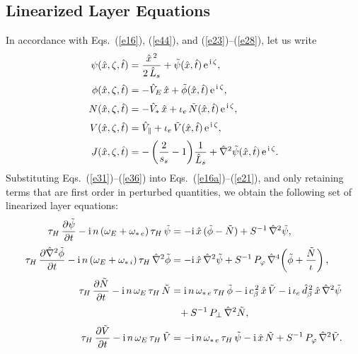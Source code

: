 \documentclass[12pt,prb,aps]{revtex4-1}
\begin{document}
\subsection{Linearized Layer Equations}
In accordance with Eqs.~(\ref{e16}), (\ref{e44}), and (\ref{e23})--(\ref{e28}), let us write
\begin{align}\label{e31}
\psi(\hat{x},\zeta,\hat{t}) &= \frac{\hat{x}^{\,2} }{2\,\hat{L}_s}+ \tilde{\psi}(\hat{x},\hat{t})\,{\rm e}^{\,{\rm i}\,\zeta},\\[0.5ex]
\phi(\hat{x},\zeta,\hat{t}) &=-\hat{V}_E\,\hat{x}+ \tilde{\phi}(\hat{x},\hat{t})\,{\rm e}^{\,{\rm i}\,\zeta},\\[0.5ex]
N(\hat{x},\zeta,\hat{t}) &= -\hat{V}_\ast\,\hat{x}+\iota_e\,\tilde{N}(\hat{x},\hat{t})\,{\rm e}^{\,{\rm i}\,\zeta},\\[0.5ex]
V(\hat{x},\zeta,\hat{t}) &= \hat{V}_\parallel +\iota_e\,\tilde{V}(\hat{x},\hat{t})\,{\rm e}^{\,{\rm i}\,\zeta},\\[0.5ex]
J(\hat{x},\zeta,\hat{t}) &=-\left(\frac{2}{s_s}-1\right)\!\frac{1}{\hat{L}_s}+ \hat{\nabla}^2\tilde{\psi}(\hat{x},\hat{t})\,{\rm e}^{\,{\rm i}\,\zeta}.\label{e36}
\end{align}
Substituting Eqs.~(\ref{e31})--(\ref{e36}) into Eqs.~(\ref{e16a})--(\ref{e21}), 
 and only retaining terms that
are first order in perturbed quantities, we obtain the following set of linearized layer equations:
\begin{align}\label{e37}
\tau_H\,\frac{\partial\tilde{\psi}}{\partial t}-{\rm i}\,n\,(\omega_E +\omega_{\ast\,e})\,\tau_H\,\tilde{\psi} &= -{\rm i} \,\hat{x}\,(\tilde{\phi}-\tilde{N})+ S^{-1}\,\hat{\nabla}^2\tilde{\psi},\\[0.5ex]
\tau_H\,\frac{\partial\hat{\nabla}^2\tilde{\phi}}{\partial t}-{\rm i}\,n\,(\omega_E+\omega_{\ast\,i})\,\tau_H\,\hat{\nabla}^2\tilde{\phi} &= -{\rm i}\,\hat{x}\,\hat{\nabla}^2\tilde{\psi}+S^{-1}\,P_\varphi\,\hat{\nabla}^4\!\left(\tilde{\phi} + \frac{\tilde{N}}{\iota}\right),\\[0.5ex]
\tau_H\,\frac{\partial\tilde{N}}{\partial t}-{\rm i}\,n\,\omega_E\,\tau_H\,\tilde{N} &= {\rm i}\,n\,\omega_{\ast\,e}\,\tau_H\,\tilde{\phi}-{\rm i}\,c_\beta^{\,2}\,\hat{x}\,\tilde{V} - {\rm i}\,\iota_e\,\hat{d}_\beta^{\,2}\,\hat{x}\,\hat{\nabla}^2\tilde{\psi}\nonumber\\[0.5ex]
&\phantom{=} + S^{-1}\,P_\perp\,\hat{\nabla}^2 \tilde{N},\label{e60}\\[0.5ex]
\tau_H\,\frac{\partial\tilde{V}}{\partial t}-{\rm i}\,n\,\omega_E\,\tau_H\,\tilde{V} &= -{\rm i}\,n\,\omega_{\ast\,e}\,\tau_H\,\tilde{\psi} - {\rm i}\,\hat{x}\,\tilde{N}
+ S^{-1}\,P_\varphi\,\hat{\nabla}^2\tilde{V}.\label{e40}
\end{align}
\end{document}
